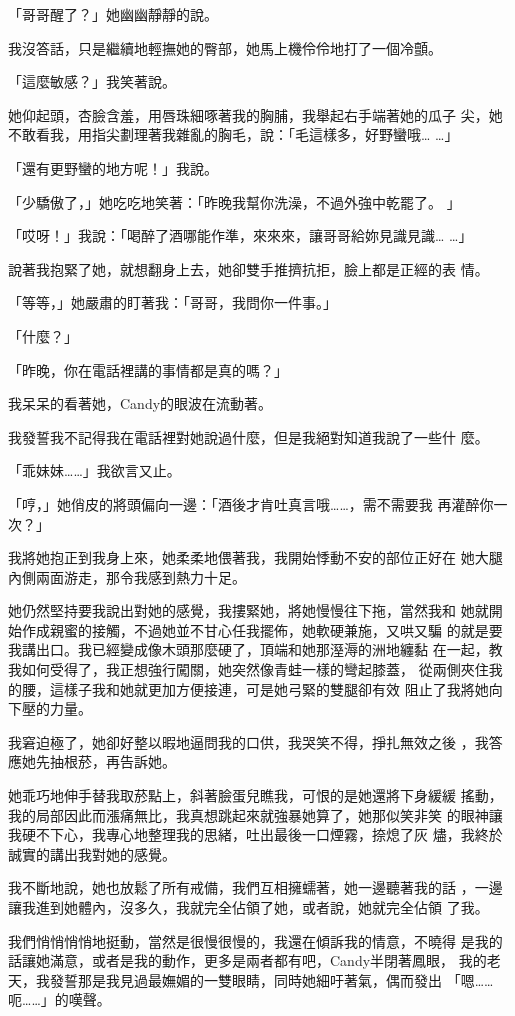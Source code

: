 「哥哥醒了？」她幽幽靜靜的說。

我沒答話，只是繼續地輕撫她的臀部，她馬上機伶伶地打了一個冷顫。

「這麼敏感？」我笑著說。

她仰起頭，杏臉含羞，用唇珠細啄著我的胸脯，我舉起右手端著她的瓜子
尖，她不敢看我，用指尖劃理著我雜亂的胸毛，說：「毛這樣多，好野蠻哦…
…」

「還有更野蠻的地方呢！」我說。

「少驕傲了，」她吃吃地笑著：「昨晚我幫你洗澡，不過外強中乾罷了。
」

「哎呀！」我說：「喝醉了酒哪能作準，來來來，讓哥哥給妳見識見識…
…」

說著我抱緊了她，就想翻身上去，她卻雙手推擠抗拒，臉上都是正經的表
情。

「等等，」她嚴肅的盯著我：「哥哥，我問你一件事。」

「什麼？」

「昨晚，你在電話裡講的事情都是真的嗎？」

我呆呆的看著她，Candy的眼波在流動著。

我發誓我不記得我在電話裡對她說過什麼，但是我絕對知道我說了一些什
麼。

「乖妹妹……」我欲言又止。

「哼，」她俏皮的將頭偏向一邊：「酒後才肯吐真言哦……，需不需要我
再灌醉你一次？」

我將她抱正到我身上來，她柔柔地偎著我，我開始悸動不安的部位正好在
她大腿內側兩面游走，那令我感到熱力十足。

她仍然堅持要我說出對她的感覺，我摟緊她，將她慢慢往下拖，當然我和
她就開始作成親蜜的接觸，不過她並不甘心任我擺佈，她軟硬兼施，又哄又騙
的就是要我講出口。我已經變成像木頭那麼硬了，頂端和她那溼溽的洲地纏黏
在一起，教我如何受得了，我正想強行闖關，她突然像青蛙一樣的彎起膝蓋，
從兩側夾住我的腰，這樣子我和她就更加方便接連，可是她弓緊的雙腿卻有效
阻止了我將她向下壓的力量。

我窘迫極了，她卻好整以暇地逼問我的口供，我哭笑不得，掙扎無效之後
，我答應她先抽根菸，再告訴她。

她乖巧地伸手替我取菸點上，斜著臉蛋兒瞧我，可恨的是她還將下身緩緩
搖動，我的局部因此而漲痛無比，我真想跳起來就強暴她算了，她那似笑非笑
的眼神讓我硬不下心，我專心地整理我的思緒，吐出最後一口煙霧，捺熄了灰
燼，我終於誠實的講出我對她的感覺。

我不斷地說，她也放鬆了所有戒備，我們互相擁蠕著，她一邊聽著我的話
，一邊讓我進到她體內，沒多久，我就完全佔領了她，或者說，她就完全佔領
了我。

我們悄悄悄悄地挺動，當然是很慢很慢的，我還在傾訴我的情意，不曉得
是我的話讓她滿意，或者是我的動作，更多是兩者都有吧，Candy半閉著鳳眼，
我的老天，我發誓那是我見過最嫵媚的一雙眼睛，同時她細吁著氣，偶而發出
「嗯……呃……」的嘆聲。

